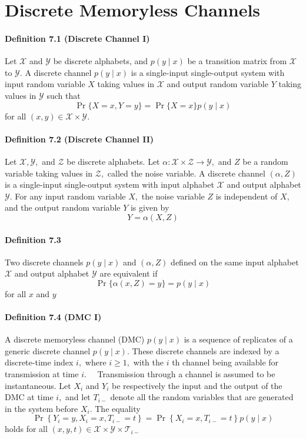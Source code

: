 \documentclass[8pt]{article}
\begin{document}
\section{Discrete Memoryless Channels}
\paragraph{Definition 7.1 (Discrete Channel I)} Let $\mathcal{X}$ and $\mathcal{Y}$ be discrete alphabets, and $p(y \mid x)$ be a transition matrix from $\mathcal{X}$ to $\mathcal{Y}$. A discrete channel $p(y \mid x)$ is a single-input single-output system with input random variable $X$ taking values in $\mathcal{X}$ and output random variable $Y$ taking values in $\mathcal{Y}$ such that
$$
\operatorname{Pr}\{X=x, Y=y\}=\operatorname{Pr}\{X=x\} p(y \mid x)
$$
for all $(x, y) \in \mathcal{X} \times \mathcal{Y}$.

\paragraph{Definition 7.2 (Discrete Channel II)} Let $\mathcal{X}, \mathcal{Y},$ and $\mathcal{Z}$ be discrete alphabets. Let $\alpha: \mathcal{X} \times \mathcal{Z} \rightarrow \mathcal{Y},$ and $Z$ be a random variable taking values in $\mathcal{Z},$ called the noise variable. A discrete channel $(\alpha, Z)$ is a single-input single-output system with input alphabet $\mathcal{X}$ and output alphabet $\mathcal{Y} .$ For any input random variable $X,$ the noise variable $Z$ is independent of $X,$ and the output random variable $Y$ is given by
$$
Y=\alpha(X, Z)
$$

\paragraph{Definition 7.3} Two discrete channels $p(y \mid x)$ and $(\alpha, Z)$ defined on the same input alphabet $\mathcal{X}$ and output alphabet $\mathcal{Y}$ are equivalent if
$$
\operatorname{Pr}\{\alpha(x, Z)=y\}=p(y \mid x)
$$
for all $x$ and $y$

\paragraph{Definition 7.4 (DMC I)} A discrete memoryless channel (DMC) $p(y \mid x)$ is a sequence of replicates of a generic discrete channel $p(y \mid x) .$ These discrete channels are indexed by a discrete-time index $i,$ where $i \geq 1,$ with the $i$ th channel being available for transmission at time $i . \quad$ Transmission through a channel is assumed to be instantaneous. Let $X_{i}$ and $Y_{i}$ be respectively the input and the output of the DMC at time $i,$ and let $T_{i-}$ denote all the random variables that are generated in the system before $X_{i} .$ The equality
$$
\operatorname{Pr}\left\{Y_{i}=y, X_{i}=x, T_{i-}=t\right\}=\operatorname{Pr}\left\{X_{i}=x, T_{i-}=t\right\} p(y \mid x)
$$
holds for all $(x, y, t) \in \mathcal{X} \times \mathcal{Y} \times \mathcal{T}_{i-}$
\end{document}
